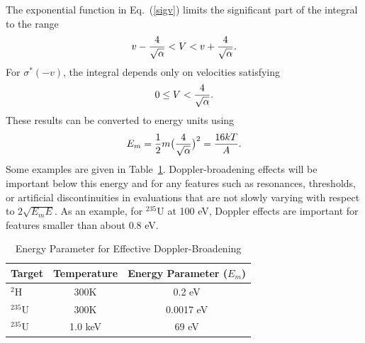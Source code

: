 \noindent
The exponential function in Eq.~(\ref{sigv}) limits the
significant part of the integral to the range
\begin{displaymath}
  v-{{4}\over {\sqrt{\alpha}}} < V
    <v+{{4} \over {\sqrt{\alpha}}} .
\end{displaymath}
For $\sigma^*(-v)$, the integral depends only on velocities
satisfying
\begin{displaymath}
   0\le V<{{4}\over{\sqrt{\alpha}}} .
\end{displaymath}
These results can be converted to energy units using
\begin{displaymath}
E_m={1\over 2} m \bigl( {4 \over \sqrt{\alpha}} \bigr)^2
    = {{16kT} \over A}.
\end{displaymath}
Some examples are given in Table~\ref{T1}.  Doppler-broadening effects
will be important below this energy and for any features such as
resonances, thresholds, or artificial discontinuities in
evaluations that are not slowly varying with respect to
$2\sqrt{E_mE}$.  As an example, for $^{235}$U at 100 eV, Doppler
effects are important for features smaller than about 0.8 eV.

\begin{table}
\caption[Energy Parameter for Effective Doppler-Broadening]
 {Energy Parameter for Effective Doppler-Broadening}
\setlength{\extrarowheight}{1pt}
\label{T1}
\begin{center}
\begin{tabular}{lcc}
Target & Temperature & Energy Parameter ($E_m$) \\
\hline
$^{2}$H & 300K & 0.2 eV \\
$^{235}$U & 300K & 0.0017 eV \\
$^{235}$U & 1.0 keV & 69 eV \\
\hline
\end{tabular}
\end{center}
\end{table}

